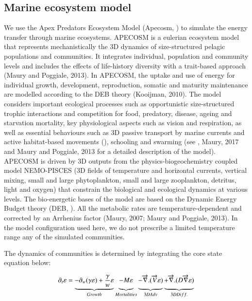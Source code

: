 \subsection{Marine ecosystem model}
\label{sec:apecosm}

We use the Apex Predators Ecosystem Model (Apecosm, \citealt{mauryModelingEnvironmentalEffects2007, mauryOverviewAPECOSMSpatialized2010}) to simulate the energy transfer through marine ecosystems. 
APECOSM is a eulerian ecosystem model that represents mechanistically the 3D dynamics of size-structured pelagic populations and communities. It integrates individual, population and community levels and includes the effects of life-history diversity with a trait-based approach (Maury and Poggiale, 2013). In APECOSM, the uptake and use of energy for individual growth, development, reproduction, somatic and maturity maintenance are modelled according to the DEB theory (Kooijman, 2010). The model considers important ecological processes such as opportunistic size-structured trophic interactions and competition for food, predatory, disease, ageing and starvation mortality, key physiological aspects such as vision and respiration, as well as essential behaviours such as 3D passive transport by marine currents and active habitat-based movements (\cite{faugerasAdvectiondiffusionreactionSizestructuredFish2005}), schooling and swarming (see \citealt{mauryModelingEnvironmentalEffects2007}, Maury, 2017 and Maury and Poggiale, 2013 for a detailed description of the model). APECOSM is driven by 3D outputs from the physics-biogeochemistry coupled model NEMO-PISCES (3D fields of temperature and horizontal currents, vertical mixing, small and large phytoplankton, small and large zooplankton, detritus, light and oxygen) that constrain the biological and ecological dynamics at various levels.
The bio-energetic bases of the model are based on the Dynamic Energy Budget theory (DEB, \citealt{kooijmanDynamicEnergyMass2000}). All the metabolic rates are temperature-dependent and corrected by an Arrhenius factor (Maury, 2007; Maury and Poggiale, 2013). In the model configuration used here, we do not prescribe a limited temperature range any of the simulated communities.

The dynamics of communities is determined by integrating the core state equation below:

\begin{equation}
\partial_t \varepsilon = \underbrace{- \partial_w(\gamma \varepsilon) + \frac{\gamma}{w}\varepsilon}_{Growth} 
\underbrace{- M \varepsilon \vphantom{\frac{\gamma}{w}\varepsilon}}_{Mortalities}
\underbrace{-\overrightarrow{\nabla}.(\overrightarrow{V} \varepsilon) \vphantom{\frac{\gamma}{w}\varepsilon}}_{3D Adv} 
\underbrace{+ \overrightarrow{\nabla} . (D \overrightarrow{\nabla} \varepsilon) \vphantom{\frac{\gamma}{w}\varepsilon}}_{3D Diff.}
\label{eq:apecosm_trend}
\end{equation}

